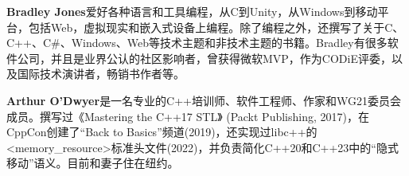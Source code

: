 \textbf{Bradley Jones}爱好各种语言和工具编程，从C到Unity，从Windows到移动平台，包括Web，虚拟现实和嵌入式设备上编程。除了编程之外，还撰写了关于C、C++、C\#、Windows、Web等技术主题和非技术主题的书籍。Bradley有很多软件公司，并且是业界公认的社区影响者，曾获得微软MVP，作为CODiE评委，以及国际技术演讲者，畅销书作者等。

\textbf{Arthur O'Dwyer}是一名专业的C++培训师、软件工程师、作家和WG21委员会成员。撰写过《Mastering the C++17 STL》 (Packt Publishing, 2017)，在CppCon创建了“Back to Basics”频道(2019)，还实现过libc++的<memory\_resource>标准头文件(2022)，并负责简化C++20和C++23中的“隐式移动”语义。目前和妻子住在纽约。